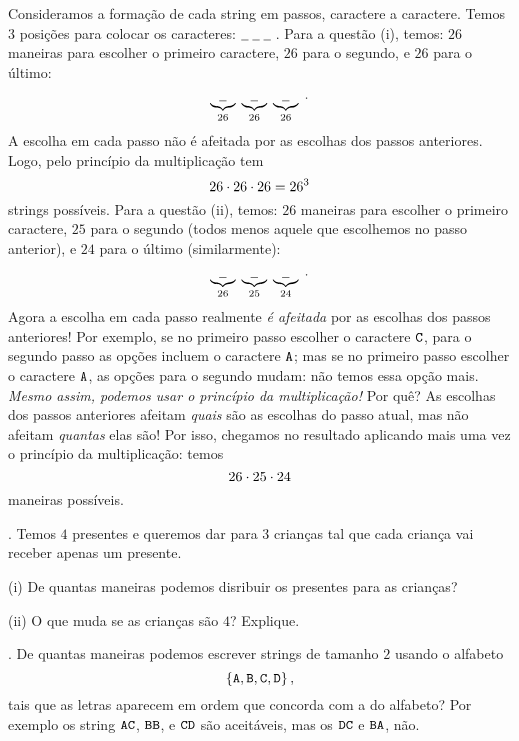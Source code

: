 \solution
Consideramos a formação de cada string em passos, caractere a caractere.
Temos 3 posições para colocar os caracteres:
$
\underline{\phantom{\txt Z}}
\;
\underline{\phantom{\txt Z}}
\;
\underline{\phantom{\txt Z}}
\;
$.
\endgraf
Para a questão (i), temos:
$26$ maneiras para escolher o primeiro caractere,
$26$ para o segundo, e
$26$ para o último:
$$
\underbrace{
\underline{\phantom{\txt Z}}
}_{26}
\;
\underbrace{
\underline{\phantom{\txt Z}}
}_{26}
\;
\underbrace{
\underline{\phantom{\txt Z}}
}_{26}
\;.
$$
A escolha em cada passo não é afeitada por as escolhas dos passos anteriores.
Logo, pelo princípio da multiplicação tem
$$
26\mathbin{\cdot} 26\mathbin{\cdot} 26 = 26^3
$$
strings possíveis.
\endgraf
Para a questão (ii), temos:
$26$ maneiras para escolher o primeiro caractere,
$25$ para o segundo (todos menos aquele que escolhemos no passo anterior), e
$24$ para o último (similarmente):
$$
\underbrace{
\underline{\phantom{\txt Z}}
}_{26}
\;
\underbrace{
\underline{\phantom{\txt Z}}
}_{25}
\;
\underbrace{
\underline{\phantom{\txt Z}}
}_{24}
\;.
$$
Agora a escolha em cada passo realmente \emph{é afeitada} por as escolhas
dos passos anteriores!
Por exemplo, se no primeiro passo escolher o caractere $\text{\tt C}$, para
o segundo passo as opções incluem o caractere $\text{\tt A}$; 
mas se no primeiro passo escolher o caractere $\text{\tt A}$, as opções para o segundo
mudam: não temos essa opção mais.
\emph{Mesmo assim, podemos usar o princípio da multiplicação!}
Por quê?
As escolhas dos passos anteriores afeitam \emph{quais} são as escolhas do passo atual,
mas não afeitam \emph{quantas} elas são!
Por isso, chegamos no resultado aplicando mais uma vez o princípio da multiplicação:
temos
$$
26\mathbin{\cdot} 25\mathbin{\cdot} 24
$$
maneiras possíveis.
\endexample

\exercise.
Temos $4$ presentes e queremos dar para $3$ crianças tal que cada criança vai
receber apenas um presente.
\item{(i)} De quantas maneiras podemos disribuir os presentes para as crianças?
\item{(ii)} O que muda se as crianças são $4$?  Explique.

\endexercise

\exercise.
De quantas maneiras podemos escrever strings de tamanho $2$ usando o alfabeto
$$
\left\{\text{\tt A}, \text{\tt B}, \text{\tt C}, \text{\tt D}\right\},
$$
tais que as letras aparecem em ordem que concorda com a do alfabeto?
Por exemplo os string $\text{\tt A} \text{\tt C}$, $\text{\tt B} \text{\tt B}$, e $\text{\tt C} \text{\tt D}$ são aceitáveis,
mas os $\text{\tt D} \text{\tt C}$ e $\text{\tt B} \text{\tt A}$, não.

